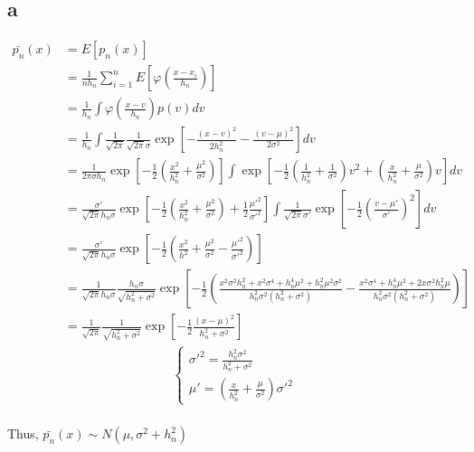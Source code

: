 \documentclass[]{article}
\begin{document}
    \subsection{a}
    \begin{align*}
    \bar{p_n}(x) &= E[p_n(x)] \\
					&= \frac{1}{n h_n}\sum_{i=1}^n E \left[ \varphi\left(\frac{x-x_i}{h_n}\right)\right] \\
					&= \frac{1}{h_n} \int \varphi\left(\frac{x-v}{h_n}\right) p(v)dv\\
					&= \frac{1}{h_n} \int \frac{1}{\sqrt{2\pi}} \frac{1}{\sqrt{2\pi}\sigma} \exp\left[ -\frac{(x-v)^2}{2h_n^2} -\frac{(v-\mu)^2}{2\sigma^2}\right]dv \\
					&= \frac{1}{2\pi\sigma h_n} \exp\left[-\frac{1}{2}\left(\frac{x^2}{h_n^2}+\frac{\mu^2}{\sigma^2}\right)\right] \int \exp\left[-\frac{1}{2}\left(\frac{1}{h_n^2}+\frac{1}{\sigma^2}\right)v^2+\left(\frac{x}{h_n^2}+\frac{\mu}{\sigma^2}\right)v\right]dv \\
					&= \frac{\sigma'}{\sqrt{2\pi}h_n\sigma} \exp\left[-\frac{1}{2}\left(\frac{x^2}{h_n^2}+\frac{\mu^2}{\sigma^2}\right)+\frac{1}{2}\frac{\mu'^2}{\sigma'^2}\right] \int\frac{1}{\sqrt{2\pi}\sigma'}\exp\left[-\frac{1}{2}\left(\frac{v-\mu'}{\sigma'}\right)^2\right]dv \\
					&= \frac{\sigma'}{\sqrt{2\pi}h_n\sigma} \exp\left[-\frac{1}{2}\left(\frac{x^2}{h^2}+\frac{\mu^2}{\sigma^2}-\frac{\mu'^2}{\sigma'^2}\right)\right] \\
					&= \frac{1}{\sqrt{2\pi}h_n\sigma} \frac{h_n\sigma}{\sqrt{h_n^2+\sigma^2}} \exp\left[-\frac{1}{2}\left(\frac{x^2\sigma^2h_n^2+x^2\sigma^4+h_n^4\mu^2+h_n^2\mu^2\sigma^2}{h_n^2\sigma^2(h_n^2+\sigma^2)}-\frac{x^2\sigma^4+h_n^4\mu^2+2x\sigma^2h_n^2\mu}{h_n^2\sigma^2(h_n^2+\sigma^2)}\right)\right] \\
					&= \frac{1}{\sqrt{2\pi}} \frac{1}{\sqrt{h_n^2+\sigma^2}}	\exp\left[-\frac{1}{2}\frac{(x-\mu)^2}{h_n^2+\sigma^2}\right]
    \end{align*}
    \begin{align*}
				\begin{cases}
					\sigma'^2 = \frac{h_n^2\sigma^2}{h_n^2+\sigma^2}\\
					\mu' = \left(\frac{x}{h_n^2}+\frac{\mu}{\sigma^2}\right)\sigma'^2
				\end{cases}
			\end{align*}
			\paragraph{}
				Thus, $\bar{p_n}(x) \sim N(\mu, \sigma^2+h_n^2)$
    
\end{document}

